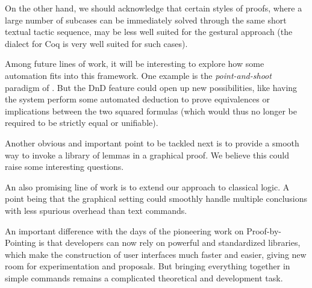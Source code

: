 On the other hand, we should acknowledge that certain styles of proofs,
where a large number of subcases can be immediately solved through the
same short textual tactic sequence, may be less well suited for the
gestural approach (the \ssreflect~\cite{SSR} dialect for Coq is very
well suited for such cases).


Among future lines of work, it will be interesting to explore how some
automation fits into this framework. One example is the \emph{point-and-shoot}
paradigm of \cite{PbP}. But the DnD feature could open up new possibilities,
like having the system perform some automated deduction to prove equivalences or
implications between the two squared formulas (which would thus no longer be
required to be strictly equal or unifiable).

Another obvious and important point to be tackled next is to provide a
smooth way to invoke a library of lemmas in a graphical proof. We
believe this could raise some interesting questions.

An also promising line of work is to extend our approach to classical
logic. A point being that the graphical setting could smoothly handle
multiple conclusions with less spurious overhead than text commands.


An important difference with the days of the pioneering work on
Proof-by-Pointing is that developers can now rely on powerful and standardized
libraries, which make the construction of user interfaces much faster and
easier, giving new room for experimentation and proposals. But bringing
everything together in simple commands remains a complicated theoretical and
development task.
